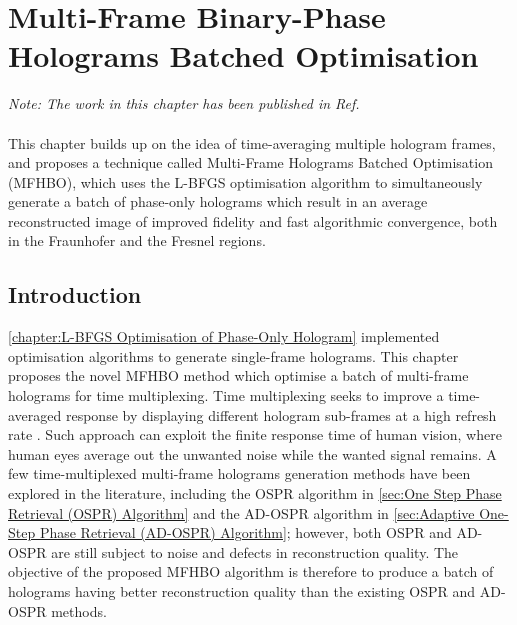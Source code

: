 \chapter{Multi-Frame Binary-Phase Holograms Batched Optimisation}
\label{chapter:Multi Frame Holograms Batched Optimisation}

\graphicspath{{Chapter_MFHBO/Figs/}}

\textit{Note: The work in this chapter has been published in Ref. \cite{Sha2024MFHBO}}\\\\

This chapter builds up on the idea of time-averaging multiple hologram frames, and proposes a technique called Multi-Frame Holograms Batched Optimisation (MFHBO), which uses the L-BFGS optimisation algorithm to simultaneously generate a batch of phase-only holograms which result in an average reconstructed image of improved fidelity and fast algorithmic convergence, both in the Fraunhofer and the Fresnel regions.

\section{Introduction}
	\cref{chapter:L-BFGS Optimisation of Phase-Only Hologram} implemented optimisation algorithms to generate single-frame holograms. This chapter proposes the novel MFHBO method which optimise a batch of multi-frame holograms for time multiplexing. Time multiplexing seeks to improve a time-averaged response by displaying different hologram sub-frames at a high refresh rate \cite{Amako1995}. Such approach can exploit the finite response time of human vision, where human eyes average out the unwanted noise while the wanted signal remains. A few time-multiplexed multi-frame holograms generation methods have been explored in the literature, including the OSPR algorithm in \cref{sec:One Step Phase Retrieval (OSPR) Algorithm} and the AD-OSPR algorithm in \cref{sec:Adaptive One-Step Phase Retrieval (AD-OSPR) Algorithm}; however, both OSPR and AD-OSPR are still subject to noise and defects in reconstruction quality. The objective of the proposed MFHBO algorithm is therefore to produce a batch of holograms having better reconstruction quality than the existing OSPR and AD-OSPR methods.


